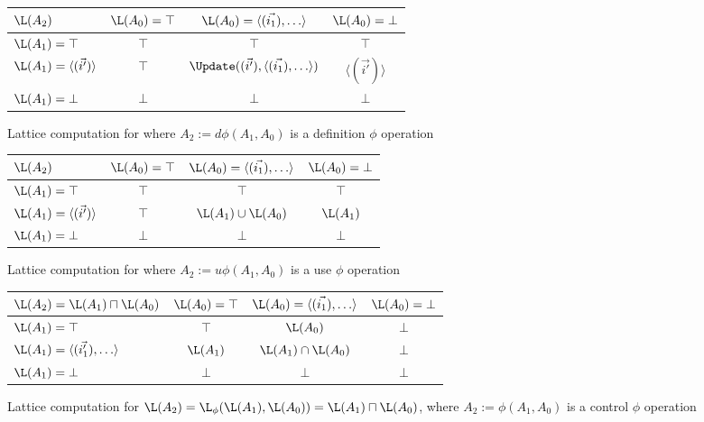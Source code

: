 \begin{figure}%
\begin{center}
\begin{tabular}{|l||c|c|c|}
\hline
$\L(A_2)$ & $\L(A_0) = \top$ & $\L(A_0) = \langle (\vec{i_1}), \ldots \rangle $ & $\L(A_0) = \bot$ \\
\hline \hline
$\L(A_1) = \top$ & $\top$ & $\top$ & $\top$ \\
\hline
$\L(A_1) = \langle(\vec{i'})\rangle$ & $\top$ & $\Update((\vec{i'}),\langle (\vec{i_1}), \ldots \rangle)$ & $\langle(\vec{i'})\rangle$ \\
\hline
$\L(A_1) = \bot$ & $\bot$ & $\bot$ & $\bot$ \\
\hline
\end{tabular}
\end{center}
\caption{Lattice computation for 
where $A_2 := d\phi(A_1, A_0)$ is
a definition $\phi$ operation}
\label{fig:scalrep-dphi}
\end{figure}

\begin{figure}%
\begin{center}
\begin{tabular}{|l||c|c|c|}
\hline
$\L(A_2)$ & $\L(A_0) = \top$ & $\L(A_0) = \langle (\vec{i_1}), \ldots \rangle $ & $\L(A_0) = \bot$ \\
\hline \hline
$\L(A_1) = \top$ & $\top$ & $\top$ & $\top$ \\
\hline
$\L(A_1) = \langle(\vec{i'})\rangle$ & $\top$ & $ \L(A_1) \cup \L(A_0)$ & $ \L(A_1)$ \\
\hline
$\L(A_1) = \bot$ & $\bot$ & $\bot$ & $\bot$ \\
\hline
\end{tabular}
\end{center}
\caption{Lattice computation for 
where $A_2 := u\phi(A_1, A_0)$ is
a use $\phi$ operation}
\label{fig:scalrep-uphi}
\end{figure}


\begin{figure}%
\begin{center}
\begin{tabular}{|l||c|c|c|}
\hline
$\L(A_2) = \L(A_1) \sqcap \L(A_0) $ & $\L(A_0) = \top$ & $\L(A_0) = \langle (\vec{i_1}), \ldots \rangle $ & $\L(A_0) = \bot$ \\
\hline \hline
$\L(A_1) = \top$ & $\top$ & $\L(A_0)$ & $\bot$ \\
\hline
$\L(A_1) = \langle(\vec{i'_1}), \ldots\rangle$ & $\L(A_1)$ & $\L(A_1) \cap \L(A_0)$ & $\bot$ \\
\hline
$\L(A_1) = \bot$ & $\bot$ & $\bot$ & $\bot$ \\
\hline
\end{tabular}
\end{center}
\caption{Lattice computation for 
$\L(A_2) = \L_{\phi}(\L(A_1), \L(A_0)) = \L(A_1) \sqcap \L(A_0) $,
where $A_2 := \phi(A_1, A_0)$ is
a control $\phi$ operation}
\label{fig:scalrep-join}
\end{figure}

